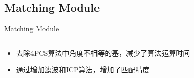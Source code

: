 \documentclass[10pt]{beamer}
\begin{document}
\subsection{Matching Module}
\begin{frame}{Matching Module}
  \begin{columns}
    \begin{column}{0.4\textwidth}
      \begin{itemize}
      \item<3-> 去除4PCS算法中角度不相等的基，减少了算法运算时间
      \item<4-> 通过增加滤波和ICP算法，增加了匹配精度
      \end{itemize}
    \end{column}
  \end{columns}
\end{frame}
\end{document}
